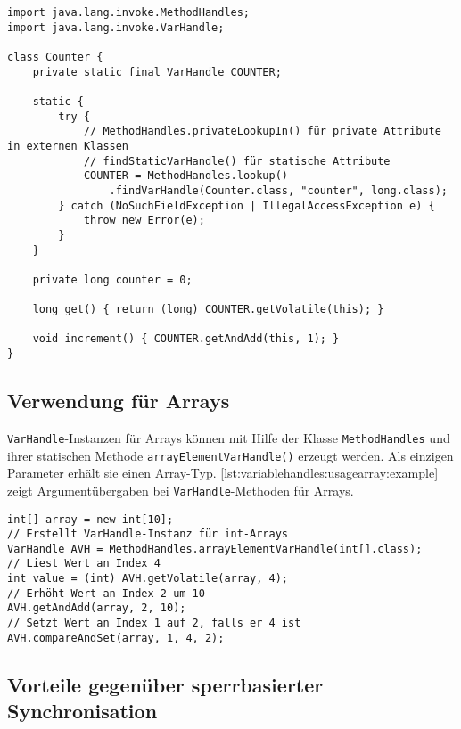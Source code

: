 \documentclass[a4paper, 11pt]{article}
\begin{document}
\begin{lstfloat}
	\begin{lstlisting}[label={lst:variablehandles:usage:example}, caption={Threadsicherer Zähler mit Variable Handles}]
import java.lang.invoke.MethodHandles;
import java.lang.invoke.VarHandle;

class Counter {
	private static final VarHandle COUNTER;
	
	static {
		try {
			// MethodHandles.privateLookupIn() für private Attribute in externen Klassen
			// findStaticVarHandle() für statische Attribute
			COUNTER = MethodHandles.lookup()
				.findVarHandle(Counter.class, "counter", long.class);
		} catch (NoSuchFieldException | IllegalAccessException e) {
			throw new Error(e);
		}
	}
	
	private long counter = 0;
	
	long get() { return (long) COUNTER.getVolatile(this); }
	
	void increment() { COUNTER.getAndAdd(this, 1); }
}	
	\end{lstlisting}
\end{lstfloat}

\subsection{Verwendung für Arrays}
\label{subsec:variablehandles:usagearray}

\verb|VarHandle|-Instanzen für Arrays können mit Hilfe der Klasse \verb|MethodHandles| und ihrer statischen Methode \verb|arrayElementVarHandle()| erzeugt werden.
Als einzigen Parameter erhält sie einen Array-Typ.
\autoref{lst:variablehandles:usagearray:example} zeigt Argumentübergaben bei \verb|VarHandle|-Methoden für Arrays.

\begin{lstfloat}
	\begin{lstlisting}[label={lst:variablehandles:usagearray:example}, caption={Variable Handles für Arrays}]
int[] array = new int[10];
// Erstellt VarHandle-Instanz für int-Arrays
VarHandle AVH = MethodHandles.arrayElementVarHandle(int[].class);
// Liest Wert an Index 4
int value = (int) AVH.getVolatile(array, 4);
// Erhöht Wert an Index 2 um 10
AVH.getAndAdd(array, 2, 10);
// Setzt Wert an Index 1 auf 2, falls er 4 ist
AVH.compareAndSet(array, 1, 4, 2);
	\end{lstlisting}
\end{lstfloat}

\subsection{Vorteile gegenüber sperrbasierter Synchronisation}
\label{subsec:variablehandles:advantages}
\end{document}
